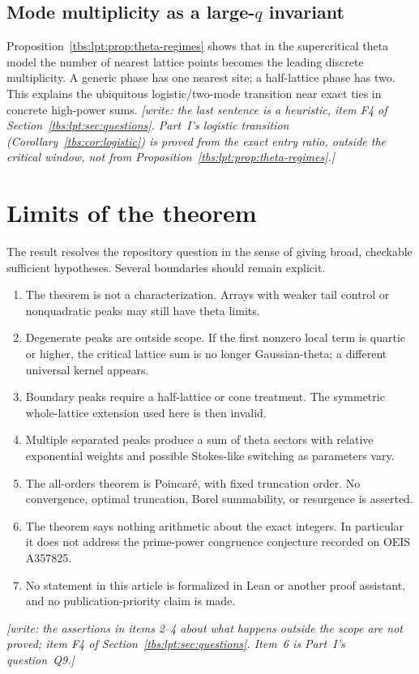 \documentclass[11pt,a4paper]{article}
\numberwithin{equation}{section}
\theoremstyle{definition}
\begin{document}
\subsection{Mode multiplicity as a large-\texorpdfstring{$q$}{q} invariant}\label{tbs:lpt:sec:modes}
Proposition~\ref{tbs:lpt:prop:theta-regimes} shows that in the
supercritical theta model the number of nearest lattice points becomes
the leading discrete multiplicity. A generic phase has one nearest site;
a half-lattice phase has two. This explains the ubiquitous
logistic/two-mode transition near exact ties in concrete high-power sums.
\emph{[write: the last sentence is a heuristic, item F4 of
Section~\ref{tbs:lpt:sec:questions}. Part~I's logistic transition
(Corollary~\ref{tbs:cor:logistic}) is proved from the exact entry ratio,
outside the critical window, not from
Proposition~\ref{tbs:lpt:prop:theta-regimes}.]}

\section{Limits of the theorem}\label{tbs:lpt:sec:limits}

The result resolves the repository question in the sense of giving broad,
checkable sufficient hypotheses. Several boundaries should remain
explicit.
\begin{enumerate}[leftmargin=*]
\item The theorem is not a characterization. Arrays with weaker tail
control or nonquadratic peaks may still have theta limits.
\item Degenerate peaks are outside scope. If the first nonzero local term
is quartic or higher, the critical lattice sum is no longer
Gaussian-theta; a different universal kernel appears.
\item Boundary peaks require a half-lattice or cone treatment. The
symmetric whole-lattice extension used here is then invalid.
\item Multiple separated peaks produce a sum of theta sectors with
relative exponential weights and possible Stokes-like switching as
parameters vary.
\item The all-orders theorem is Poincar\'e, with fixed truncation order.
No convergence, optimal truncation, Borel summability, or resurgence is
asserted.
\item The theorem says nothing arithmetic about the exact integers. In
particular it does not address the prime-power congruence conjecture
recorded on OEIS A357825.
\item No statement in this article is formalized in Lean or another
proof assistant, and no publication-priority claim is made.
\end{enumerate}
\emph{[write: the assertions in items 2--4 about what happens outside the
scope are not proved; item F4 of Section~\ref{tbs:lpt:sec:questions}.
Item~6 is Part~I's question~Q9.]}
\end{document}
